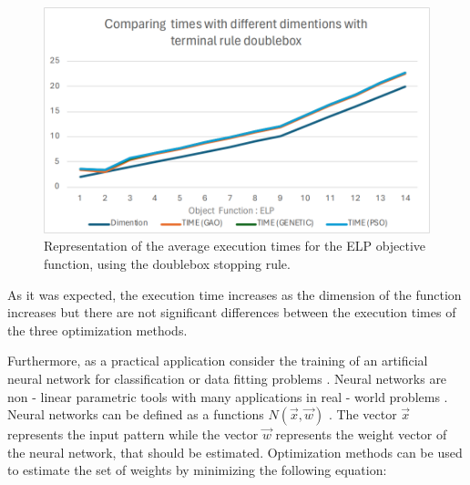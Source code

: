 \documentclass[journal,article,submit,pdftex,moreauthors]{Definitions/mdpi}
\begin{document}
\begin{figure}[H]
\hspace{-5pt}\includegraphics[scale=0.5]{time_doublebox.png}
\caption{Representation of the  average execution times for the ELP objective function, using the doublebox stopping rule. \label{fig:timeDouble}}
\end{figure}
As it was expected, the execution time increases as the dimension of the function increases but there are not significant differences between the execution times of the three optimization methods.

Furthermore, as a practical application consider the training of an artificial neural network for classification or data fitting problems \cite{ann1,ann2}.  Neural networks are non - linear parametric tools with many applications in real - world problems \cite{ann_agri,ann_facial,ann_physics}.
Neural networks can be defined as a functions \textbf{$N(\overrightarrow{x},\overrightarrow{w})$
}. The vector $\overrightarrow{x}$ represents the input pattern
while the vector \textbf{$\overrightarrow{w}$ }represents  the weight vector of the neural network, that should be estimated.
Optimization methods can be used to estimate the set of weights by minimizing the following
equation:
\end{document}
